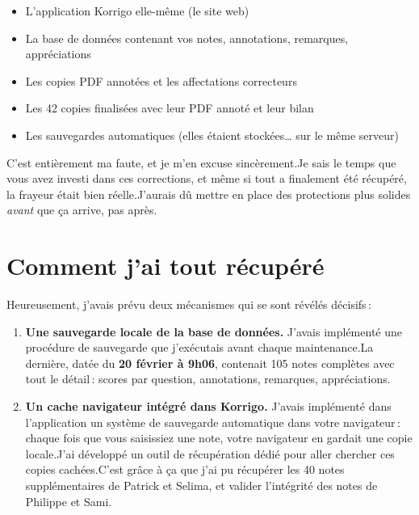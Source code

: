 \documentclass[11pt,a4paper]{article}
\begin{document}
\begin{kobox}
	\begin{itemize}
		\item L'application Korrigo elle-m\^{e}me (le site web)
		\item La base de donn\'{e}es contenant vos notes, annotations, remarques, appr\'{e}ciations
		\item Les copies PDF annot\'{e}es et les affectations correcteurs
		\item Les 42 copies finalis\'{e}es avec leur PDF annot\'{e} et leur bilan
		\item Les sauvegardes automatiques (elles \'{e}taient stock\'{e}es\ldots{} sur le m\^{e}me serveur)
	\end{itemize}
\end{kobox}

C'est enti\`{e}rement ma faute, et je m'en excuse sinc\`{e}rement.\@ Je sais le temps que vous avez investi dans ces corrections, et m\^{e}me si tout a finalement \'{e}t\'{e} r\'{e}cup\'{e}r\'{e}, la frayeur \'{e}tait bien r\'{e}elle.\@ J'aurais d\^{u} mettre en place des protections plus solides \emph{avant} que \c{c}a arrive, pas apr\`{e}s.

\section{Comment j'ai tout r\'{e}cup\'{e}r\'{e}}

Heureusement, j'avais pr\'{e}vu deux m\'{e}canismes qui se sont r\'{e}v\'{e}l\'{e}s d\'{e}cisifs\,:

\begin{enumerate}
	\item \textbf{Une sauvegarde locale de la base de donn\'{e}es.} J'avais impl\'{e}ment\'{e} une proc\'{e}dure de sauvegarde que j'ex\'{e}cutais avant chaque maintenance.\@ La derni\`{e}re, dat\'{e}e du \textbf{20 f\'{e}vrier \`{a} 9h06}, contenait 105 notes compl\`{e}tes avec tout le d\'{e}tail\,: scores par question, annotations, remarques, appr\'{e}ciations.

	\item \textbf{Un cache navigateur int\'{e}gr\'{e} dans Korrigo.} J'avais impl\'{e}ment\'{e} dans l'application un syst\`{e}me de sauvegarde automatique dans votre navigateur\,: chaque fois que vous saisissiez une note, votre navigateur en gardait une copie locale.\@ J'ai d\'{e}velopp\'{e} un outil de r\'{e}cup\'{e}ration d\'{e}di\'{e} pour aller chercher ces copies cach\'{e}es.\@ C'est gr\^{a}ce \`{a} \c{c}a que j'ai pu r\'{e}cup\'{e}rer les 40 notes suppl\'{e}mentaires de Patrick et Selima, et valider l'int\'{e}grit\'{e} des notes de Philippe et Sami.
\end{enumerate}
\end{document}

